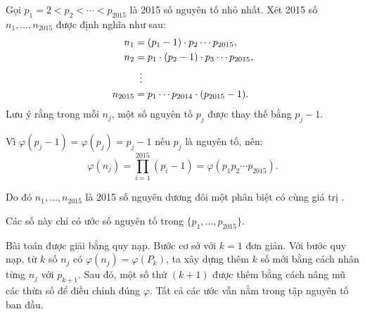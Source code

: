 \documentclass[../09-contruction-methods.tex]{subfiles}
\begin{document}
\begin{soln}
	Gọi \( p_1 = 2 < p_2 < \cdots < p_{2015} \) là 2015 số nguyên tố nhỏ nhất.  
	Xét 2015 số \( n_1, \dots, n_{2015} \) được định nghĩa như sau:
	\begin{align*}
		n_1 &= (p_1 - 1)\cdot p_2 \cdots p_{2015}, \\
		n_2 &= p_1 \cdot (p_2 - 1) \cdot p_3 \cdots p_{2015}, \\
		&\vdotswithin{=} \\
		n_{2015} &= p_1 \cdots p_{2014} \cdot (p_{2015} - 1).
	\end{align*}
	Lưu ý rằng trong mỗi \( n_j \), một số nguyên tố \( p_j \) được thay thế bằng \( p_j - 1 \).  

	Vì \( \varphi(p_j - 1) = \varphi(p_j) = p_j - 1 \) nếu \( p_j \) là nguyên tố, nên:
	\[
		\varphi(n_j) = \prod_{i=1}^{2015} (p_i - 1) = \varphi(p_1 p_2 \cdots p_{2015}).
	\]

	Do đó \( n_1, \dots, n_{2015} \) là 2015 số nguyên dương đôi một phân biệt có cùng giá trị .

	Các số này chỉ có ước số nguyên tố trong \( \{p_1, \dots, p_{2015}\} \).
\end{soln}


\newpage

\begin{story*}
    Bài toán được giải bằng quy nạp. Bước cơ sở với \( k = 1 \) đơn giản. Với bước quy nạp, từ \( k \) số \( n_j \) có \( \varphi(n_j) = \varphi(P_k) \), ta xây dựng thêm \( k \) số mới bằng cách nhân từng \( n_j \) với \( p_{k+1} \). Sau đó, một số thứ \( (k+1) \) được thêm bằng cách nâng mũ các thừa số để điều chỉnh đúng \( \varphi \). Tất cả các ước vẫn nằm trong tập nguyên tố ban đầu.
\end{story*}
\end{document}
